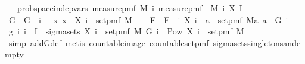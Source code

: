 \begin{isabellebody}
\ \ \ {\isachardoublequoteopen}prob{\isacharunderscore}{\kern0pt}space{\isachardot}{\kern0pt}indep{\isacharunderscore}{\kern0pt}vars\ {\isacharparenleft}{\kern0pt}measure{\isacharunderscore}{\kern0pt}pmf\ M{\isacharparenright}{\kern0pt}\ {\isacharparenleft}{\kern0pt}{\isasymlambda}i{\isachardot}{\kern0pt}\ measure{\isacharunderscore}{\kern0pt}pmf\ {\isacharparenleft}{\kern0pt}\ M{\isacharprime}{\kern0pt}\ i{\isacharparenright}{\kern0pt}{\isacharparenright}{\kern0pt}\ X\ I{\isachardoublequoteclose}\isanewline
%
\isadelimproof
%
\endisadelimproof
%
\isatagproof
{}\isamarkupfalse%
\ {\isacharminus}{\kern0pt}\isanewline
\ \ \isamarkupfalse%
\ G\ \ {\isachardoublequoteopen}G\ {\isacharequal}{\kern0pt}\ {\isacharparenleft}{\kern0pt}{\isasymlambda}i{\isachardot}{\kern0pt}\ {\isacharbraceleft}{\kern0pt}{\isacharbraceleft}{\kern0pt}{\isacharbraceright}{\kern0pt}{\isacharbraceright}{\kern0pt}\ {\isasymunion}\ {\isacharparenleft}{\kern0pt}{\isasymlambda}x{\isachardot}{\kern0pt}\ {\isacharbraceleft}{\kern0pt}x{\isacharbraceright}{\kern0pt}{\isacharparenright}{\kern0pt}\ {\isacharbackquote}{\kern0pt}\ {\isacharparenleft}{\kern0pt}X\ i\ {\isacharbackquote}{\kern0pt}\ set{\isacharunderscore}{\kern0pt}pmf\ M{\isacharparenright}{\kern0pt}{\isacharparenright}{\kern0pt}{\isachardoublequoteclose}\isanewline
\ \ \isamarkupfalse%
\ F\ \ {\isachardoublequoteopen}F\ {\isacharequal}{\kern0pt}\ {\isacharparenleft}{\kern0pt}{\isasymlambda}i{\isachardot}{\kern0pt}\ {\isacharbraceleft}{\kern0pt}X\ i\ {\isacharminus}{\kern0pt}{\isacharbackquote}{\kern0pt}\ a\ {\isasyminter}\ set{\isacharunderscore}{\kern0pt}pmf\ M{\isacharbar}{\kern0pt}a{\isachardot}{\kern0pt}\ a\ {\isasymin}\ G\ i{\isacharbraceright}{\kern0pt}{\isacharparenright}{\kern0pt}{\isachardoublequoteclose}\isanewline
\isanewline
\ \ \isamarkupfalse%
\ g{\isacharcolon}{\kern0pt}\ {\isachardoublequoteopen}{\isasymAnd}i{\isachardot}{\kern0pt}\ i\ {\isasymin}\ I\ {\isasymLongrightarrow}\ sigma{\isacharunderscore}{\kern0pt}sets\ {\isacharparenleft}{\kern0pt}X\ i\ {\isacharbackquote}{\kern0pt}\ set{\isacharunderscore}{\kern0pt}pmf\ M{\isacharparenright}{\kern0pt}\ {\isacharparenleft}{\kern0pt}G\ i{\isacharparenright}{\kern0pt}\ {\isacharequal}{\kern0pt}\ Pow\ {\isacharparenleft}{\kern0pt}X\ i\ {\isacharbackquote}{\kern0pt}\ set{\isacharunderscore}{\kern0pt}pmf\ M{\isacharparenright}{\kern0pt}{\isachardoublequoteclose}\isanewline
\ \ \ \ \isamarkupfalse%
\ {\isacharparenleft}{\kern0pt}simp\ add{\isacharcolon}{\kern0pt}G{\isacharunderscore}{\kern0pt}def{\isacharcomma}{\kern0pt}\ metis\ countable{\isacharunderscore}{\kern0pt}image\ countable{\isacharunderscore}{\kern0pt}set{\isacharunderscore}{\kern0pt}pmf\ sigma{\isacharunderscore}{\kern0pt}sets{\isacharunderscore}{\kern0pt}singletons{\isacharunderscore}{\kern0pt}and{\isacharunderscore}{\kern0pt}empty{\isacharparenright}{\kern0pt}\isanewline

\end{isabellebody}
